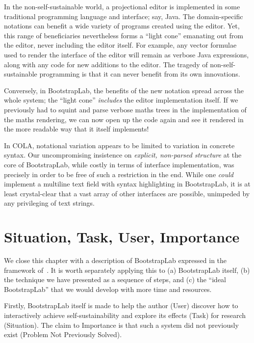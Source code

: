 \documentclass[ twoside,openright,titlepage,numbers=noenddot,headinclude,footinclude,cleardoublepage=empty,abstract=on,
                BCOR=5mm,paper=a4,fontsize=11pt
                ]{scrreprt}
\theoremstyle{definition}
\begin{document}
In the non-self-sustainable world, a projectional editor is implemented
in some traditional programming language and interface; say, Java. The
domain-specific notations can benefit a wide variety of programs created
using the editor. Yet, this range of beneficiaries nevertheless forms a
``light cone'' emanating out from the editor, never including the editor
itself. For example, any vector formulae used to render the interface of
the editor will remain as verbose Java expressions, along with any code
for new additions to the editor. The tragedy of non-self-sustainable
programming is that it can never benefit from its own innovations.

Conversely, in BootstrapLab, the benefits of the new notation spread
across the whole system; the ``light cone'' \emph{includes} the editor
implementation itself. If we previously had to squint and parse verbose
maths trees in the implementation of the maths rendering, we can now
open up the code again and see it rendered in the more readable way that
it itself implements!

In \ac{COLA}, notational variation appears to be limited to variation in
concrete syntax. Our uncompromising insistence on \emph{explicit,
non-parsed structure} at the core of BootstrapLab, while costly in terms
of interface implementation, was precisely in order to be free of such a
restriction in the end. While one \emph{could} implement a multiline
text field with syntax highlighting in BootstrapLab, it is at least
crystal-clear that a vast array of other interfaces are possible,
unimpeded by any privileging of text strings.

\hypertarget{situation-task-user-importance}{\section{Situation, Task, User,
Importance}\label{situation-task-user-importance}}

We close this chapter with a description of BootstrapLab expressed in
the framework of~\cite{EvUISR}. It is worth separately applying this to
(a) BootstrapLab itself, (b) the technique we have presented as a
sequence of steps, and (c) the ``ideal BootstrapLab'' that we would
develop with more time and resources.

Firstly, BootstrapLab itself is made to help the author (User) discover
how to interactively achieve self-sustainability and explore its effects
(Task) for research (Situation). The claim to Importance is that such a
system did not previously exist (Problem Not Previously Solved).
\end{document}
